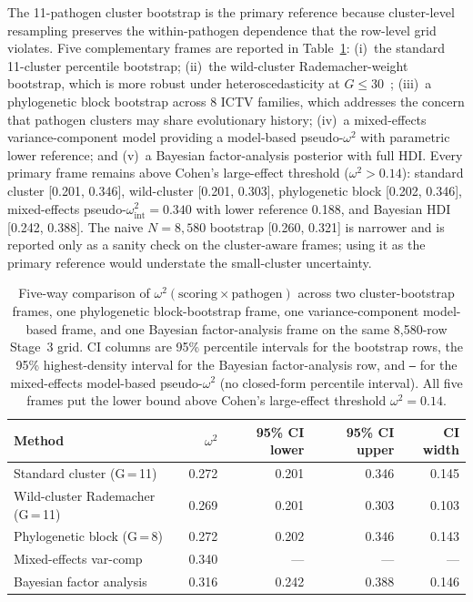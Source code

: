 The 11-pathogen cluster bootstrap is the primary reference because cluster-level resampling preserves the within-pathogen dependence that the row-level grid violates. Five complementary frames are reported in Table~\ref{tab:omega_robustness_5way}: (i)~the standard 11-cluster percentile bootstrap; (ii)~the wild-cluster Rademacher-weight bootstrap, which is more robust under heteroscedasticity at $G \leq 30$~\cite{cameron2008bootstrap}; (iii)~a phylogenetic block bootstrap across 8 ICTV families, which addresses the concern that pathogen clusters may share evolutionary history; (iv)~a mixed-effects variance-component model providing a model-based pseudo-$\omega^2$ with parametric lower reference; and (v)~a Bayesian factor-analysis posterior with full HDI. Every primary frame remains above Cohen's large-effect threshold ($\omega^2>0.14$): standard cluster [0.201, 0.346], wild-cluster [0.201, 0.303], phylogenetic block [0.202, 0.346], mixed-effects pseudo-$\omega^2_{\text{int}}=0.340$ with lower reference 0.188, and Bayesian HDI [0.242, 0.388]. The naive $N=8{,}580$ bootstrap [0.260, 0.321] is narrower and is reported only as a sanity check on the cluster-aware frames; using it as the primary reference would understate the small-cluster uncertainty.
\begin{table}[h]
\centering
\small
\caption[Five-way $\omega^2$ robustness comparison]{Five-way comparison of $\omega^2(\text{scoring} \times \text{pathogen})$ across two cluster-bootstrap frames, one phylogenetic block-bootstrap frame, one variance-component model-based frame, and one Bayesian factor-analysis frame on the same 8{,}580-row Stage~3 grid. CI columns are 95\% percentile intervals for the bootstrap rows, the 95\% highest-density interval for the Bayesian factor-analysis row, and \texttt{---} for the mixed-effects model-based pseudo-$\omega^2$ (no closed-form percentile interval). All five frames put the lower bound above Cohen's large-effect threshold $\omega^2 = 0.14$.}
\label{tab:omega_robustness_5way}
\begin{tabular}{lrrrr}
\toprule
Method & $\omega^2$ & 95\% CI lower & 95\% CI upper & CI width \\
\midrule
Standard cluster (G\,=\,11)        & 0.272 & 0.201 & 0.346 & 0.145 \\
Wild-cluster Rademacher (G\,=\,11) & 0.269 & 0.201 & 0.303 & 0.103 \\
Phylogenetic block (G\,=\,8)       & 0.272 & 0.202 & 0.346 & 0.143 \\
Mixed-effects var-comp             & 0.340 & ---   & ---   & ---   \\
Bayesian factor analysis           & 0.316 & 0.242 & 0.388 & 0.146 \\
\bottomrule
\end{tabular}
\end{table}

